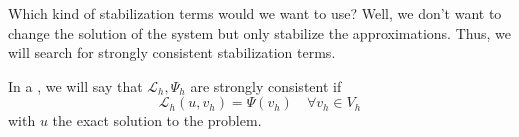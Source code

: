 Which kind of stabilization terms would we want to use? Well, we don't want to change the solution of the system but only stabilize the approximations. Thus, we will search for strongly consistent stabilization terms.

\begin{defn} In a , we will say that $\mathcal{L}_h, Ψ_h$ are strongly consistent if \[ \mathcal{L}_h(u, v_h) = Ψ(v_h) \quad ∀v_h ∈ V_h\] with $u$ the exact solution to the problem.
\end{defn}

